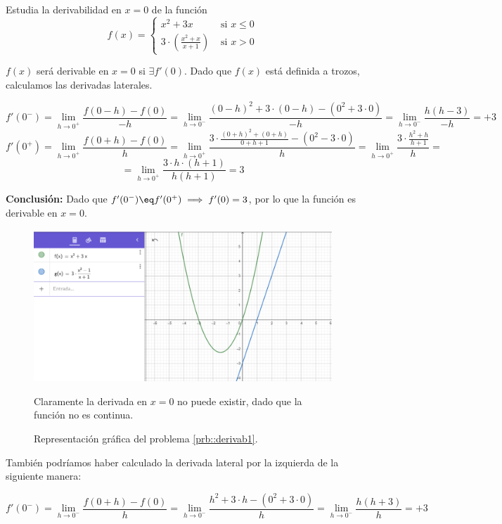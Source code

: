 \begin{problem} Estudia la derivabilidad en $x=0$ de la función 
\label{prb::derivab1}
\[f(x) = \begin{cases} x^2+3x & \text{ si } x\leq 0\\ 3·\left(\frac{x^2+x}{x+1}\right)&\text{ si } x>0\end{cases}\]
\solution

$f(x)$ será derivable en $x=0$ si $\exists f'(0)$. Dado que $f(x)$ está definida a trozos, calculamos las derivadas laterales.

\[f'(0^-) = \lim_{h\to 0^+} \frac{f(0-h)-f(0)}{-h} = \lim_{h\to 0^-} \frac{(0-h)^2+3·(0-h)-(0^2+3·0)}{-h} = \lim_{h\to 0^-} \frac{h(h-3)}{-h} = +3\]
\[f'(0^+) = \lim_{h\to 0^+} \frac{f(0+h)-f(0)}{h} = \lim_{h\to 0^+} \frac{3·\frac{(0+h)^2+(0+h)}{0+h+1} - (0^2-3·0)}{h} = \lim_{h\to 0^+} \frac{3·\frac{h^2+h}{h+1}}{h} = \]
\[=\lim_{h\to 0^+} \frac{3·h·(h+1)}{h(h+1)} = 3 \]

\textbf{Conclusión:} Dado que  $f'(0^-) \eq f'(0^+) \implies f'(0) = 3$, por lo que la función es derivable en $x=0$.

\begin{figure}[h!]
\centering
\includegraphics[scale=0.5]{img/DerivabilidadEjer1}
\label{fig::DerivabEjer1}
\caption{Representación gráfica del problema \ref{prb::derivab1}.}
Claramente la derivada en $x=0$ no puede existir, dado que la función no es continua.
\end{figure}

\obs También podríamos haber calculado la derivada lateral por la izquierda de la siguiente manera:

\[f'(0^-) = \lim_{h\to 0^-} \frac{f(0+h)-f(0)}{h} = \lim_{h\to 0^-} \frac{h^2+3·h-(0^2+3·0)}{h} = \lim_{h\to 0^-} \frac{h(h+3)}{h} = +3\]

\end{problem}


